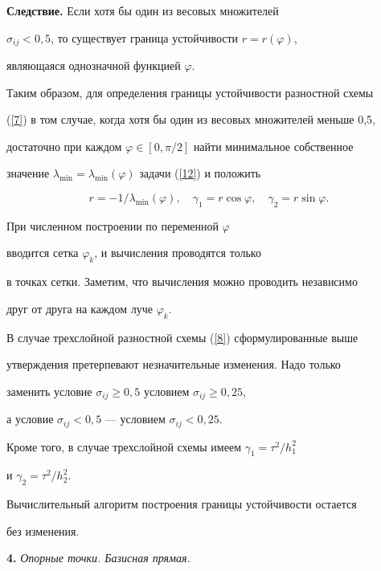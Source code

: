 {\bf Следствие.} Если хотя бы один из весовых множителей


$\sigma_{ij} < 0,5$, то существует граница устойчивости $r= r(\varphi)$,


являющаяся однозначной функцией $\varphi$.


\medskip





Таким образом, для определения границы устойчивости разностной схемы


(\ref{7}) в том случае, когда хотя бы один из весовых множителей меньше 0,5,


достаточно при каждом $\varphi\in [0,\pi/2 ]$ найти минимальное собственное


значение $\lambda_{\min}=\lambda_{\min}(\varphi)$ задачи (\ref{12}) и положить


$$


r=-1/\lambda_{\min}(\varphi),\quad


\gamma_{1}=r\cos\varphi, \quad


\gamma_{2}=r\sin\varphi.


$$


При численном построении по переменной $\varphi$


вводится сетка ${\varphi_{k}}$, и вычисления проводятся только


в точках сетки. Заметим, что вычисления можно проводить независимо


друг от друга на каждом луче $\varphi_{k}$.





В случае трехслойной разностной схемы (\ref{8}) сформулированные выше


утверждения претерпевают незначительные изменения. Надо только


заменить условие $\sigma_{ij}\ge 0,5$ условием $\sigma_{ij}\ge 0,25$,


а условие $\sigma_{ij}< 0,5$ --- условием $\sigma_{ij}< 0,25$.


Кроме того, в случае трехслойной схемы имеем $\gamma_1 = \tau^2/h_1^2$


и $\gamma_2 = \tau^2/h_2^2$.


Вычислительный алгоритм построения границы устойчивости остается


без изменения.


\medskip





{\bf 4.} {\it Опорные точки. Базисная прямая.}


